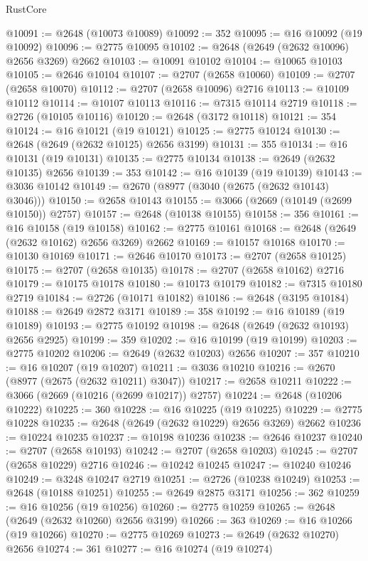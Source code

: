 \begin{lexlean}{RustCore}
\begin{coremodule}
@10091 := @2648 (@10073 @10089)
@10092 := 352
@10095 := @16 @10092 (@19 @10092)
@10096 := @2775 @10095
@10102 := @2648 (@2649 (@2632 @10096) @2656 @3269) @2662
@10103 := @10091 @10102
@10104 := @10065 @10103
@10105 := @2646 @10104
@10107 := @2707 (@2658 @10060)
@10109 := @2707 (@2658 @10070)
@10112 := @2707 (@2658 @10096) @2716
@10113 := @10109 @10112
@10114 := @10107 @10113
@10116 := @7315 @10114 @2719
@10118 := @2726 (@10105 @10116)
@10120 := @2648 (@3172 @10118)
@10121 := 354
@10124 := @16 @10121 (@19 @10121)
@10125 := @2775 @10124
@10130 := @2648 (@2649 (@2632 @10125) @2656 @3199)
@10131 := 355
@10134 := @16 @10131 (@19 @10131)
@10135 := @2775 @10134
@10138 := @2649 (@2632 @10135) @2656
@10139 := 353
@10142 := @16 @10139 (@19 @10139)
@10143 := @3036 @10142
@10149 := @2670 (@8977 (@3040 (@2675 (@2632 @10143) @3046)))
@10150 := @2658 @10143
@10155 := @3066 (@2669 (@10149 (@2699 @10150)) @2757)
@10157 := @2648 (@10138 @10155)
@10158 := 356
@10161 := @16 @10158 (@19 @10158)
@10162 := @2775 @10161
@10168 := @2648 (@2649 (@2632 @10162) @2656 @3269) @2662
@10169 := @10157 @10168
@10170 := @10130 @10169
@10171 := @2646 @10170
@10173 := @2707 (@2658 @10125)
@10175 := @2707 (@2658 @10135)
@10178 := @2707 (@2658 @10162) @2716
@10179 := @10175 @10178
@10180 := @10173 @10179
@10182 := @7315 @10180 @2719
@10184 := @2726 (@10171 @10182)
@10186 := @2648 (@3195 @10184)
@10188 := @2649 @2872 @3171
@10189 := 358
@10192 := @16 @10189 (@19 @10189)
@10193 := @2775 @10192
@10198 := @2648 (@2649 (@2632 @10193) @2656 @2925)
@10199 := 359
@10202 := @16 @10199 (@19 @10199)
@10203 := @2775 @10202
@10206 := @2649 (@2632 @10203) @2656
@10207 := 357
@10210 := @16 @10207 (@19 @10207)
@10211 := @3036 @10210
@10216 := @2670 (@8977 (@2675 (@2632 @10211) @3047))
@10217 := @2658 @10211
@10222 := @3066 (@2669 (@10216 (@2699 @10217)) @2757)
@10224 := @2648 (@10206 @10222)
@10225 := 360
@10228 := @16 @10225 (@19 @10225)
@10229 := @2775 @10228
@10235 := @2648 (@2649 (@2632 @10229) @2656 @3269) @2662
@10236 := @10224 @10235
@10237 := @10198 @10236
@10238 := @2646 @10237
@10240 := @2707 (@2658 @10193)
@10242 := @2707 (@2658 @10203)
@10245 := @2707 (@2658 @10229) @2716
@10246 := @10242 @10245
@10247 := @10240 @10246
@10249 := @3248 @10247 @2719
@10251 := @2726 (@10238 @10249)
@10253 := @2648 (@10188 @10251)
@10255 := @2649 @2875 @3171
@10256 := 362
@10259 := @16 @10256 (@19 @10256)
@10260 := @2775 @10259
@10265 := @2648 (@2649 (@2632 @10260) @2656 @3199)
@10266 := 363
@10269 := @16 @10266 (@19 @10266)
@10270 := @2775 @10269
@10273 := @2649 (@2632 @10270) @2656
@10274 := 361
@10277 := @16 @10274 (@19 @10274)

\end{coremodule}
\end{lexlean}
